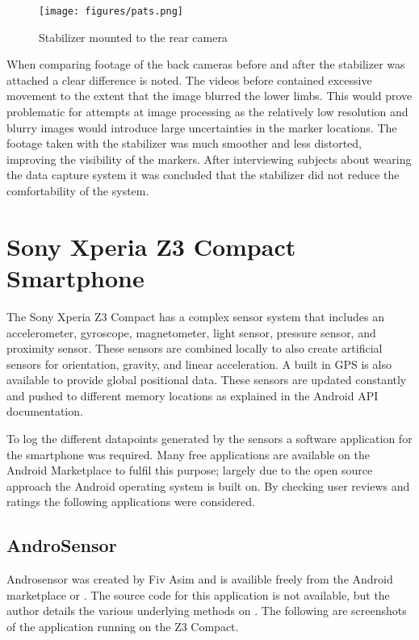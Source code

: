\begin{figure}[!ht] 
\captionsetup{width=0.8\linewidth, font=small}  
\texttt{[image: figures/pats.png]}
\caption{Stabilizer mounted to the rear camera}
\label{fig:pats}
\end{figure}

When comparing footage of the back cameras before and after the stabilizer was attached a clear difference is noted. The videos before contained excessive movement to the extent that the image blurred the lower limbs. This would prove problematic for attempts at image processing as the relatively low resolution and blurry images would introduce large uncertainties in the marker locations. The footage taken with the stabilizer was much smoother and less distorted, improving the visibility of the markers. After interviewing subjects about wearing the data capture system it was concluded that the stabilizer did not reduce the comfortability of the system. 

\section{Sony Xperia Z3 Compact Smartphone}
The Sony Xperia Z3 Compact has a complex sensor system that includes an accelerometer, gyroscope, magnetometer, light sensor, pressure sensor, and proximity sensor. These sensors are combined locally to also create artificial sensors for orientation, gravity, and linear acceleration. A built in GPS is also available to provide global positional data. These sensors are updated constantly and pushed to different memory locations as explained in the Android API documentation. 

To log the different datapoints generated by the sensors a software application for the smartphone was required. Many free applications are available on the Android Marketplace to fulfil this purpose; largely due to the open source approach the Android operating system is built on. By checking user reviews and ratings the following applications were considered.

\subsection{AndroSensor}
Androsensor was created by Fiv Asim and is availible freely from the Android marketplace or \cite{androsensor}. The source code for this application is not available, but the author details the various underlying methods on \cite{androsensor}. The following are screenshots of the application running on the Z3 Compact.


